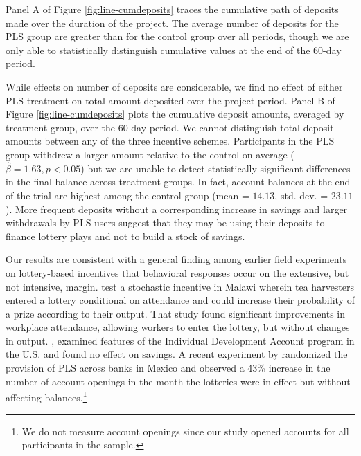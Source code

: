 \documentclass[12pt]{article}
\begin{document}
		Panel A of Figure \ref{fig:line-cumdeposits} traces the cumulative path of deposits made over the duration of the project. The average number of deposits for the PLS group are greater than for the control group over all periods, though we are only able to statistically distinguish cumulative values at the end of the 60-day period.

		While effects on number of deposits are considerable, we find no effect of either PLS treatment on total amount deposited over the project period. Panel B of Figure \ref{fig:line-cumdeposits} plots the cumulative deposit amounts, averaged by treatment group, over the 60-day period. We cannot distinguish total deposit amounts between any of the three incentive schemes. Participants in the PLS group withdrew a larger amount relative to the control on average ($\hat \beta = 1.63, p < 0.05$) but we are unable to detect statistically significant differences in the final balance across treatment groups. In fact, account balances at the end of the trial are highest among the control group (mean = $14.13$, std. dev. = $23.11$). More frequent deposits without a corresponding increase in savings and larger withdrawals by PLS users suggest that they may be using their deposits to finance lottery plays and not to build a stock of savings.

		

		Our results are consistent with a general finding among earlier field experiments on lottery-based incentives that behavioral responses occur on the extensive, but not intensive, margin. \textcite{brune_effect_2015} test a stochastic incentive in Malawi wherein tea harvesters entered a lottery conditional on attendance and could increase their probability of a prize according to their output. That study found significant improvements in workplace attendance, allowing workers to enter the lottery, but without changes in output. \textcite{loibl_testing_2016}, examined features of the Individual Development Account program in the U.S. and found no effect on savings. A recent experiment by \textcite{gertler_long-term_2017} randomized the provision of PLS across banks in Mexico and observed a 43\% increase in the number of account openings in the month the lotteries were in effect but without affecting balances.\footnote{We do not measure account openings since our study opened accounts for all participants in the sample.}
\end{document}
